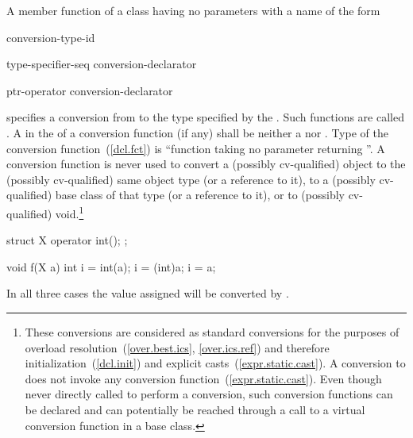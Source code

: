 \pnum
A member function of a class  having no parameters with a name of the form

\begin{bnf}
\br
     conversion-type-id
\end{bnf}

\begin{bnf}
\br
    type-specifier-seq conversion-declarator\opt
\end{bnf}

\begin{bnf}
\br
    ptr-operator conversion-declarator\opt
\end{bnf}

specifies a conversion from
to the type specified by the
.
Such functions are called .
A  in the 
of a conversion function (if any) shall be neither
a  nor .
%
Type of the conversion function~(\ref{dcl.fct}) is
``function taking no parameter returning
''.
A conversion function is never used to convert a (possibly cv-qualified) object
to the (possibly cv-qualified) same object type (or a reference to it),
to a (possibly cv-qualified) base class of that type (or a reference to it),
or to (possibly cv-qualified) void.\footnote{These conversions are considered
as standard conversions for the purposes of overload resolution~(\ref{over.best.ics}, \ref{over.ics.ref}) and therefore initialization~(\ref{dcl.init}) and explicit casts~(\ref{expr.static.cast}). A conversion to  does not invoke any conversion function~(\ref{expr.static.cast}).
Even though never directly called to perform a conversion,
such conversion functions can be declared and can potentially
be reached through a call to a virtual conversion function in a base class.}

\enterexample

\begin{codeblock}
struct X {
  operator int();
};

void f(X a) {
  int i = int(a);
  i = (int)a;
  i = a;
}
\end{codeblock}

In all three cases the value assigned will be converted by
.
\exitexample

